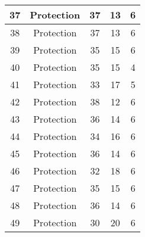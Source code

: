 \documentclass[results.tex]{subfiles}
\begin{document}
\begin{center}
\begin{tabular}{| c || c | c | c | c |}
            \hline
            37                      & Protection                   & 37                     & 13                      & 6                    \\
            \hline
            38                      & Protection                   & 37                     & 13                      & 6                    \\
            \hline
            39                      & Protection                   & 35                     & 15                      & 6                    \\
            \hline
            40                      & Protection                   & 35                     & 15                      & 4                    \\
            \hline
            41                      & Protection                   & 33                     & 17                      & 5                    \\
            \hline
            42                      & Protection                   & 38                     & 12                      & 6                    \\
            \hline
            43                      & Protection                   & 36                     & 14                      & 6                    \\
            \hline
            44                      & Protection                   & 34                     & 16                      & 6                    \\
            \hline
            45                      & Protection                   & 36                     & 14                      & 6                    \\
            \hline
            46                      & Protection                   & 32                     & 18                      & 6                    \\
            \hline
            47                      & Protection                   & 35                     & 15                      & 6                    \\
            \hline
            48                      & Protection                   & 36                     & 14                      & 6                    \\
            \hline
            49                      & Protection                   & 30                     & 20                      & 6                    \\
            \hline
        \end{tabular}
    \end{center}
\end{document}
